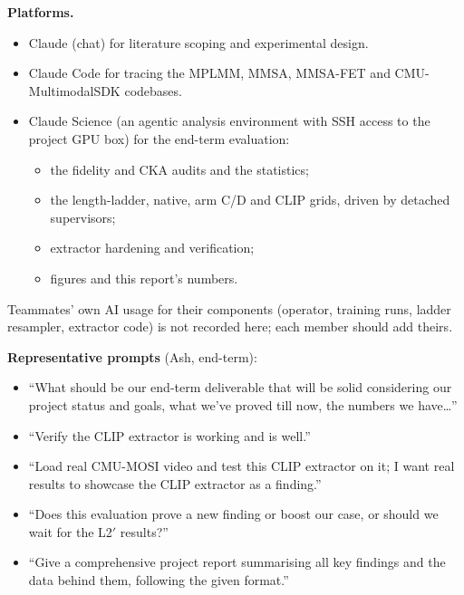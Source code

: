 \documentclass[lettersize,journal]{IEEEtran}
\begin{document}
\textbf{Platforms.}
\begin{itemize}
\item Claude (chat) for literature scoping and experimental design.
\item Claude Code for tracing the MPLMM, MMSA, MMSA-FET and CMU-MultimodalSDK codebases.
\item Claude Science (an agentic analysis environment with SSH access to the project GPU box) for the end-term evaluation:
  \begin{itemize}
  \item the fidelity and CKA audits and the statistics;
  \item the length-ladder, native, arm C/D and CLIP grids, driven by detached supervisors;
  \item extractor hardening and verification;
  \item figures and this report's numbers.
  \end{itemize}
\end{itemize}
Teammates' own AI usage for their components (operator, training runs, ladder resampler, extractor code) is not recorded here; each member should add theirs.

\textbf{Representative prompts} (Ash, end-term):
\begin{itemize}
\item ``What should be our end-term deliverable that will be solid considering our project status and goals, what we've proved till now, the numbers we have\ldots''
\item ``Verify the CLIP extractor is working and is well.''
\item ``Load real CMU-MOSI video and test this CLIP extractor on it; I want real results to showcase the CLIP extractor as a finding.''
\item ``Does this evaluation prove a new finding or boost our case, or should we wait for the L2$'$ results?''
\item ``Give a comprehensive project report summarising all key findings and the data behind them, following the given format.''
\end{itemize}
\end{document}
